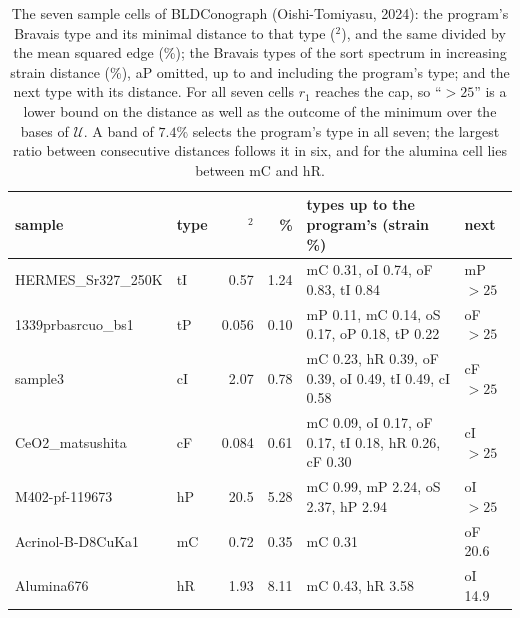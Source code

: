 \documentclass[preprint,pdf]{iucr}          %
\newcommand{\Ang}{\text{\AA}}
\begin{document}
\begin{table}
\caption{The seven sample cells of BLDConograph (Oishi-Tomiyasu, 2024): the program's Bravais type and its minimal distance to that type (\Ang$^2$), and the same divided by the mean squared edge (\%); the Bravais types of the sort spectrum in increasing strain distance (\%), aP omitted, up to and including the program's type; and the next type with its distance. For all seven cells $r_1$ reaches the cap, so ``$>25$'' is a lower bound on the distance as well as the outcome of the minimum over the bases of $\mathcal U$. A band of $7.4\%$ selects the program's type in all seven; the largest ratio between consecutive distances follows it in six, and for the alumina cell lies between mC and hR.}
\label{tab:conograph}
\begin{footnotesize}
\begin{tabular}{llrrp{4.6cm}l}
\toprule
sample & type & \Ang$^2$ & \% & types up to the program's (strain \%) & next \\
\midrule
HERMES\_Sr327\_250K & tI & 0.57 & 1.24 & mC 0.31, oI 0.74, oF 0.83, tI 0.84 & mP $>25$ \\
1339prbasrcuo\_bs1 & tP & 0.056 & 0.10 & mP 0.11, mC 0.14, oS 0.17, oP 0.18, tP 0.22 & oF $>25$ \\
sample3 & cI & 2.07 & 0.78 & mC 0.23, hR 0.39, oF 0.39, oI 0.49, tI 0.49, cI 0.58 & cF $>25$ \\
CeO2\_matsushita & cF & 0.084 & 0.61 & mC 0.09, oI 0.17, oF 0.17, tI 0.18, hR 0.26, cF 0.30 & cI $>25$ \\
M402-pf-119673 & hP & 20.5 & 5.28 & mC 0.99, mP 2.24, oS 2.37, hP 2.94 & oI $>25$ \\
Acrinol-B-D8CuKa1 & mC & 0.72 & 0.35 & mC 0.31 & oF 20.6 \\
Alumina676 & hR & 1.93 & 8.11 & mC 0.43, hR 3.58 & oI 14.9 \\
\bottomrule
\end{tabular}
\end{footnotesize}
\end{table}
\end{document}
